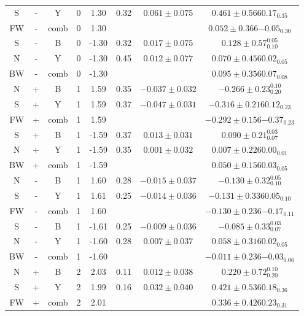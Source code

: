 \begin{table}
\begin{center}
\begin{tabular}{|c c c |c c | c|c| c|}
  S &     -  &   Y  & 0 &  1.30 & 0.32 & $ 0.061\pm  0.075$ & $  0.461 \pm 0.56 6{0.17} _{0.35}$ \\ 
 FW &     -  & comb & 0 &  1.30 & &&$   0.052 \pm 0.36 6{ -0.05} _{0.30} $\\ \hline 
  S &     -  &   B  & 0 & -1.30 & 0.32 & $ 0.017\pm  0.075$ & $   0.128\pm  0.57 ^{0.05} _{0.10} $\\
  N &     -  &   Y  & 0 & -1.30 & 0.45 & $ 0.012\pm  0.077$ & $  0.070 \pm 0.45 6{0.02} _{0.05}$ \\ 
 BW &     -  & comb & 0 & -1.30 & &&$   0.095 \pm 0.35 6{ 0.07} _{0.08} $\\ \hline 
  N &     +  &   B  & 1 &  1.59 & 0.35 & $-0.037\pm  0.032$ & $  -0.266\pm  0.23 ^{0.10} _{0.20} $\\
  S &     +  &   Y  & 1 &  1.59 & 0.37 & $-0.047\pm  0.031$ & $ -0.316 \pm 0.21 6{0.12} _{0.23}$ \\ 
 FW &     +  & comb & 1 &  1.59 & &&$  -0.292 \pm 0.15 6{ -0.37} _{0.23} $\\ \hline 
  S &     +  &   B  & 1 & -1.59 & 0.37 & $ 0.013\pm  0.031$ & $   0.090\pm  0.21 ^{0.03} _{0.07} $\\
  N &     +  &   Y  & 1 & -1.59 & 0.35 & $ 0.001\pm  0.032$ & $  0.007 \pm 0.22 6{0.00} _{0.01}$ \\ 
 BW &     +  & comb & 1 & -1.59 & &&$   0.050 \pm 0.15 6{ 0.03} _{0.05} $\\ \hline 
  N &     -  &   B  & 1 &  1.60 & 0.28 & $-0.015\pm  0.037$ & $  -0.130\pm  0.32 ^{0.05} _{0.10} $\\
  S &     -  &   Y  & 1 &  1.61 & 0.25 & $-0.014\pm  0.036$ & $ -0.131 \pm 0.33 6{0.05} _{0.10}$ \\ 
 FW &     -  & comb & 1 &  1.60 & &&$  -0.130 \pm 0.23 6{ -0.17} _{0.11} $\\ \hline 
  S &     -  &   B  & 1 & -1.61 & 0.25 & $-0.009\pm  0.036$ & $  -0.085\pm  0.33 ^{0.03} _{0.07} $\\
  N &     -  &   Y  & 1 & -1.60 & 0.28 & $ 0.007\pm  0.037$ & $  0.058 \pm 0.31 6{0.02} _{0.05}$ \\ 
 BW &     -  & comb & 1 & -1.60 & &&$  -0.011 \pm 0.23 6{ -0.03} _{0.06} $\\ \hline 
  N &     +  &   B  & 2 &  2.03 & 0.11 & $ 0.012\pm  0.038$ & $   0.220\pm  0.72 ^{0.10} _{0.20} $\\
  S &     +  &   Y  & 2 &  1.99 & 0.16 & $ 0.032\pm  0.040$ & $  0.421 \pm 0.53 6{0.18} _{0.36}$ \\ 
 FW &     +  & comb & 2 &  2.01 & &&$   0.336 \pm 0.42 6{ 0.23} _{0.31} $\\ \hline 

\end{tabular}
\end{center}
\end{table}
